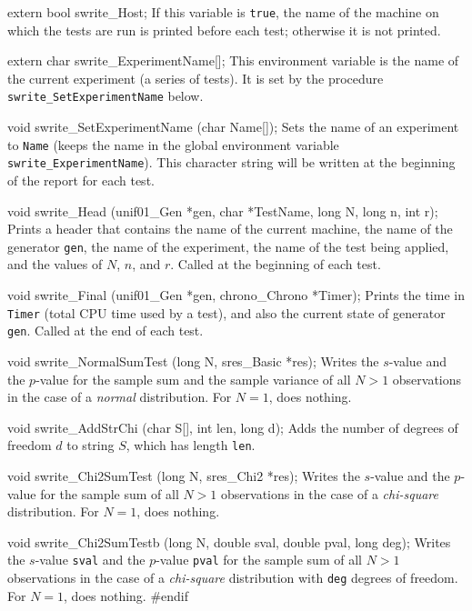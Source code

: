 extern bool swrite_Host;
\endcode
 \tab If this variable is {\tt true}, the name of the machine on which
the tests are run is printed before each test; otherwise it is not
printed.
 \endtab


\ifdetailed

\code

extern char swrite_ExperimentName[];
\endcode
 \tab This environment variable is the name of the current experiment
   (a series of tests). It is set by the procedure
   {\tt swrite\_SetExperimentName} below.
 \endtab
\code


void swrite_SetExperimentName (char Name[]);
\endcode
 \tab Sets the name of an experiment to {\tt Name} (keeps the name in the
  global environment variable {\tt swrite\_ExperimentName}).
  This character string will be written at the beginning of the
  report for each test.
\endtab
\code


void swrite_Head (unif01_Gen *gen, char *TestName, long N, long n, int r);
\endcode
 \tab
 Prints a header that contains the name of the current machine,
 the name of the generator {\tt gen},
 the name of the experiment, the name of the test being applied,
 and the values of $N$, $n$, and $r$.  Called at the beginning of each test.
\endtab
\code


void swrite_Final (unif01_Gen *gen, chrono_Chrono *Timer);
\endcode
\tab Prints the time in {\tt Timer} (total CPU time used by a test),
  and also the current state of generator {\tt gen}.
  Called at the end of each test.
\endtab
\code


void swrite_NormalSumTest (long N, sres_Basic *res);
\endcode
\tab  Writes the $s$-value and the $p$-value for the sample sum and the sample
  variance of all $N>1$ observations in the case of a {\em normal\/} distribution.
  For $N=1$, does nothing.
\endtab
\code


void swrite_AddStrChi (char S[], int len, long d);
\endcode
\tab Adds the number of degrees of freedom $d$ to string $S$,
  which has length {\tt len}.
\endtab
\code


void swrite_Chi2SumTest (long N, sres_Chi2 *res);
\endcode
\tab  Writes the $s$-value and the $p$-value for the sample sum
  of all $N>1$ observations in the case of a {\em chi-square\/} distribution.
  For $N=1$, does nothing.
\endtab
\code


void swrite_Chi2SumTestb (long N, double sval, double pval, long deg);
\endcode
\tab  Writes the $s$-value {\tt sval} and the $p$-value {\tt pval} for the
  sample sum of all $N>1$ observations in the case of a {\em chi-square\/}
  distribution with {\tt deg} degrees of freedom. For $N=1$, does nothing.
\endtab
\fi
\code\hide
#endif
\endhide\endcode
